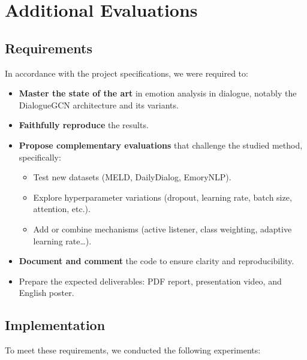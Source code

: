 \documentclass[a4paper,11pt]{article}
\begin{document}
\section{Additional Evaluations}

\subsection{Requirements}
In accordance with the project specifications, we were required to:
\begin{itemize}
  \item \textbf{Master the state of the art} in emotion analysis in dialogue, notably the DialogueGCN architecture and its variants.
  \item \textbf{Faithfully reproduce} the results.
  \item \textbf{Propose complementary evaluations} that challenge the studied method, specifically:
    \begin{itemize}
      \item Test new datasets (MELD, DailyDialog, EmoryNLP).
      \item Explore hyperparameter variations (dropout, learning rate, batch size, attention, etc.).
      \item Add or combine mechanisms (active listener, class weighting, adaptive learning rate…).
    \end{itemize}
  \item \textbf{Document and comment} the code to ensure clarity and reproducibility.
  \item Prepare the expected deliverables: PDF report, presentation video, and English poster.
\end{itemize}

\subsection{Implementation}
To meet these requirements, we conducted the following experiments:
\end{document}
